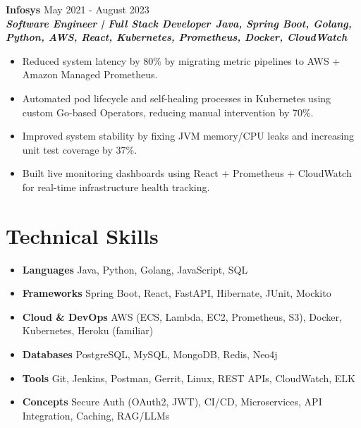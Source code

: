 \documentclass[a4paper,11pt]{article}
\begin{document}
\textbf{Infosys} \hfill May 2021 - August 2023\\[1pt]
\textbf{\textit{Software Engineer | Full Stack Developer}}\ \hfill \textbf{\textit{Java, Spring Boot, Golang, Python, AWS, React, Kubernetes, Prometheus, Docker, CloudWatch}}\vspace{-5pt}
\begin{itemize}[nosep, after=\strut, leftmargin=1em, itemsep=0.8pt]
    \item Reduced system latency by 80\% by migrating metric pipelines to AWS + Amazon Managed Prometheus.
    \item Automated pod lifecycle and self-healing processes in Kubernetes using custom Go-based Operators, reducing manual intervention by 70\%.
    \item Improved system stability by fixing JVM memory/CPU leaks and increasing unit test coverage by 37\%.
    \item Built live monitoring dashboards using React + Prometheus + CloudWatch for real-time infrastructure health tracking.
    \end{itemize}




\section{Technical Skills}
\begin{itemize}[nosep, after=\strut, leftmargin=1em, itemsep=1pt]
\item \textbf{Languages} \hspace*{1em} Java, Python, Golang, JavaScript, SQL
\item \textbf{Frameworks} \hspace*{1em} Spring Boot, React, FastAPI, Hibernate, JUnit, Mockito
\item \textbf{Cloud \& DevOps} \hspace*{1em} AWS (ECS, Lambda, EC2, Prometheus, S3), Docker, Kubernetes, Heroku (familiar)
\item \textbf{Databases} \hspace*{1em} PostgreSQL, MySQL, MongoDB, Redis, Neo4j
\item \textbf{Tools} \hspace*{1em} Git, Jenkins, Postman, Gerrit, Linux, REST APIs, CloudWatch, ELK
\item \textbf{Concepts} \hspace*{1em} Secure Auth (OAuth2, JWT), CI/CD, Microservices, API Integration, Caching, RAG/LLMs
\end{itemize}
\end{document}
